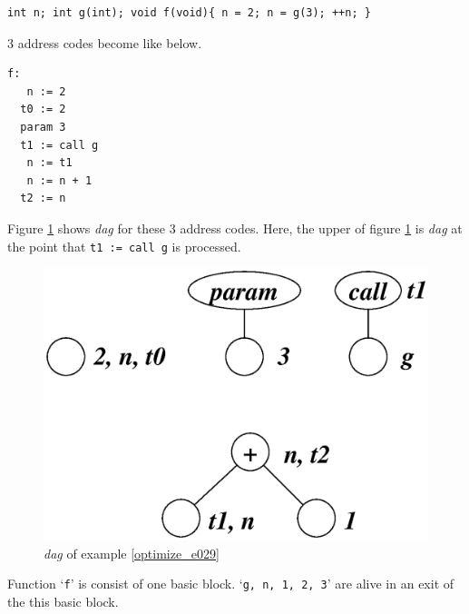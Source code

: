 \begin{Example}
\label{optimize_e029}
\begin{verbatim}
int n; int g(int); void f(void){ n = 2; n = g(3); ++n; }
\end{verbatim}
3 address codes become like below.
\begin{verbatim}
f:
   n := 2
  t0 := 2
  param 3
  t1 := call g
   n := t1
   n := n + 1
  t2 := n
\end{verbatim}
Figure \ref{optimize_e030} shows {\em dag} for these 3 address codes.
Here, the upper of figure \ref{optimize_e030} is {\em dag}
at the point that {\tt{t1 := call g}} is processed.
\begin{figure}[htbp]
\begin{center}
\includegraphics[width=0.8\linewidth,height=0.571\linewidth]{opt013.eps}
\caption{{\em dag} of example \ref{optimize_e029}}
\label{optimize_e030}
\end{center}
\end{figure}
Function `{\tt{f}}' is consist of one basic block.
`{\tt{g, n, 1, 2, 3}}' are alive in an exit of the this basic block.


\end{Example}
